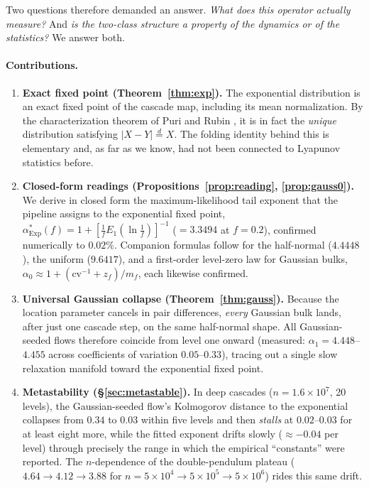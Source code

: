 \documentclass[11pt,a4paper]{article}
\theoremstyle{remark}
\newcommand{\Exp}{\mathrm{Exp}}
\newcommand{\cv}{\mathrm{cv}}
\newcommand{\eqd}{\stackrel{d}{=}}
\begin{document}
Two questions therefore demanded an answer. \emph{What does this operator actually measure?} And
\emph{is the two-class structure a property of the dynamics or of the statistics?} We answer both.

\paragraph{Contributions.}
\begin{enumerate}\itemsep2pt
\item \textbf{Exact fixed point (Theorem~\ref{thm:exp}).} The exponential distribution is an exact
fixed point of the cascade map, including its mean normalization. By the characterization theorem of
Puri and Rubin \cite{purirubin}, it is in fact the \emph{unique} distribution satisfying
$|X-Y|\eqd X$. The folding identity behind this is elementary and, as far as we know, had not been
connected to Lyapunov statistics before.
\item \textbf{Closed-form readings (Propositions~\ref{prop:reading}, \ref{prop:gauss0}).} We derive
in closed form the maximum-likelihood tail exponent that the pipeline assigns to the exponential
fixed point, $\alpha^*_{\Exp}(f)=1+[\tfrac1f E_1(\ln\tfrac1f)]^{-1}$ ($=3.3494$ at $f=0.2$), confirmed
numerically to $0.02\%$. Companion formulas follow for the half-normal ($4.4448$), the uniform
($9.6417$), and a first-order level-zero law for Gaussian bulks,
$\alpha_0 \approx 1 + (\cv^{-1}+z_f)/m_f$, each likewise confirmed.
\item \textbf{Universal Gaussian collapse (Theorem~\ref{thm:gauss}).} Because the location parameter
cancels in pair differences, \emph{every} Gaussian bulk lands, after just one cascade step, on the
same half-normal shape. All Gaussian-seeded flows therefore coincide from level one onward (measured:
$\alpha_1 = 4.448$--$4.455$ across coefficients of variation $0.05$--$0.33$), tracing out a single
slow relaxation manifold toward the exponential fixed point.
\item \textbf{Metastability (\S\ref{sec:metastable}).} In deep cascades ($n=1.6\times10^{7}$, 20
levels), the Gaussian-seeded flow's Kolmogorov distance to the exponential collapses from $0.34$ to
$0.03$ within five levels and then \emph{stalls} at $0.02$--$0.03$ for at least eight more, while the
fitted exponent drifts slowly ($\approx-0.04$ per level) through precisely the range in which the
empirical ``constants'' were reported. The $n$-dependence of the double-pendulum plateau
($4.64 \to 4.12 \to 3.88$ for $n=5\times10^4 \to 5\times10^5 \to 5\times10^6$) rides this same drift.

\end{enumerate}
\end{document}
